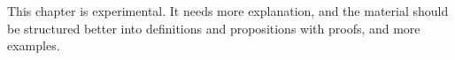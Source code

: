 \documentclass[../../../include/open-logic-chapter]{subfiles}
\begin{document}

\begin{editorial}
  This chapter is experimental. It needs more explanation, and the
  material should be structured better into definitions and
  propositions with proofs, and more examples.
\end{editorial}


\OLEndChapterHook
\end{document}
